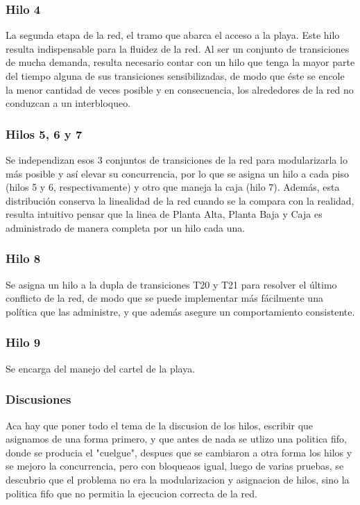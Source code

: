 \documentclass[12pt,a4paper]{article}
\begin{document}
\subsubsection*{Hilo 4}
La segunda etapa de la red, el tramo que abarca el acceso a la playa.
Este hilo resulta indispensable para la fluidez de la red. Al ser un conjunto de transiciones de mucha demanda, resulta necesario contar con un hilo que tenga la mayor parte del tiempo alguna de sus transiciones sensibilizadas, de modo que éste se encole la menor cantidad de veces posible y en consecuencia, los alrededores de la red no conduzcan a un interbloqueo.
\subsubsection*{Hilos 5, 6 y 7}
Se independizan esos 3 conjuntos de transiciones de la red para modularizarla lo más posible y así elevar su concurrencia, por lo que se asigna un hilo a cada piso (hilos 5 y 6, respectivamente) y otro que maneja la caja (hilo 7). Además, esta distribución conserva la linealidad de la red cuando se la compara con la realidad, resulta intuitivo pensar que la linea de Planta Alta, Planta Baja y Caja es administrado de manera completa por un hilo cada una.
\subsubsection*{Hilo 8}
Se asigna un hilo a la dupla de transiciones T20 y T21 para resolver el último conflicto de la red, de modo que se puede implementar más fácilmente una política que las administre, y que además asegure un comportamiento consistente. 
\subsubsection*{Hilo 9}
Se encarga del manejo del cartel de la playa.

\subsubsection*{Discusiones}
Aca hay que poner todo el tema de la discusion de los hilos, escribir que asignamos de una forma primero, y que antes de nada se utlizo una politica fifo, donde se producia el "cuelgue", despues que se cambiaron a otra forma los hilos y se mejoro la concurrencia, pero con bloqueaos igual, luego de varias pruebas, se descubrio que el problema no era la modularizacion y asignacion de hilos, sino la politica fifo que no permitia la ejecucion correcta de la red.
\end{document}
